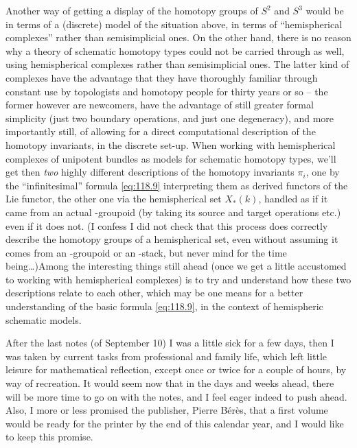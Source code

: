 Another way of getting a display of the homotopy groups of $S^2$ and
$S^3$ would be in terms of a (discrete) model of the situation above,
in terms of ``hemispherical complexes'' rather than semisimplicial
ones. On the other hand, there is no reason why a theory of schematic
homotopy types could not be carried through as well, using
hemispherical complexes rather than semisimplicial ones. The latter
kind of complexes have the advantage that they have
 thoroughly familiar through constant use
by topologists and homotopy people for thirty years or so -- the
former however are newcomers, have the advantage of still greater
formal simplicity (just two boundary operations, and just one
degeneracy), and more importantly still, of allowing for a direct
computational description of the homotopy invariants, in the discrete
set-up. When working with hemispherical complexes of unipotent bundles
as models for schematic homotopy types, we'll get then \emph{two}
highly different descriptions of the homotopy invariants $\pi_i$, one
by the ``infinitesimal'' formula \eqref{eq:118.9} interpreting them as
derived functors of the Lie functor, the other one via the
hemispherical set $X_*(k)$, handled as if it came from an actual
\oo-groupoid (by taking its source and target operations etc.) even if
it does not. (I confess I did not check that this process does
correctly describe the homotopy groups of a hemispherical set, even
without assuming it comes from an \oo-groupoid or an \oo-stack, but
never mind for the time being\dots)\enspace Among the interesting
things still ahead (once we get a little accustomed to working with
hemispherical complexes) is to try and understand how these two
descriptions relate to each other, which may be one means for a better
understanding of the basic formula \eqref{eq:118.9}, in the context of
hemispheric schematic models.

\bigbreak

\presectionfill{}\par

\label{sec:119}%
After the last notes (of September 10) I was a little sick for a few
days, then I was taken by current tasks from professional and family
life, which left little leisure for mathematical reflection, except
once or twice for a couple of hours, by way of recreation. It would
seem now that in the days and weeks ahead, there will be more time to
go on with the notes, and I feel eager indeed to push ahead. Also, I
more or less promised the publisher, Pierre Bérès, that a first volume
would be ready for the printer by the end of this calendar year, and I
would like to keep this promise.

